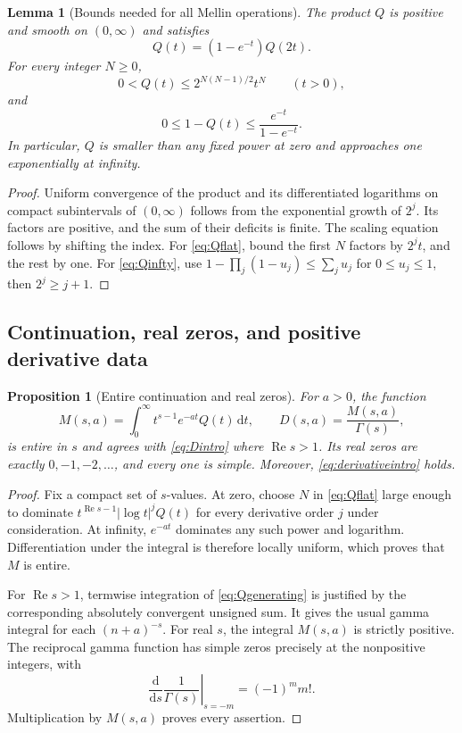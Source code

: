 \documentclass[11pt,letterpaper]{article}
\numberwithin{equation}{section}
\newtheorem{proposition}[theorem]{Proposition}
\newtheorem{lemma}[theorem]{Lemma}
\theoremstyle{definition}
\theoremstyle{remark}
\newcommand{\dd}{\,\mathrm d}
\DeclareMathOperator{\Rea}{Re}
\begin{document}
\begin{lemma}[Bounds needed for all Mellin operations]\label{lem:Qbounds}
The product $Q$ is positive and smooth on $(0,\infty)$ and satisfies
\begin{equation}\label{eq:Qscale}
 Q(t)=(1-e^{-t})Q(2t).
\end{equation}
For every integer $N\ge0$,
\begin{equation}\label{eq:Qflat}
 0<Q(t)\le 2^{N(N-1)/2}t^N\qquad(t>0),
\end{equation}
and
\begin{equation}\label{eq:Qinfty}
 0\le1-Q(t)\le\frac{e^{-t}}{1-e^{-t}}.
\end{equation}
In particular, $Q$ is smaller than any fixed power at zero and approaches
one exponentially at infinity.
\end{lemma}
\begin{proof}
Uniform convergence of the product and its differentiated logarithms on
compact subintervals of $(0,\infty)$ follows from the exponential growth of
$2^j$. Its factors are positive, and the sum of their deficits is finite.
The scaling equation follows by shifting the index.
For \eqref{eq:Qflat}, bound the first $N$ factors by $2^jt$, and the rest
by one. For \eqref{eq:Qinfty}, use
$1-\prod_j(1-u_j)\le\sum_j u_j$ for $0\le u_j\le1$, then
$2^j\ge j+1$.
\end{proof}

\subsection{Continuation, real zeros, and positive derivative data}
\begin{proposition}[Entire continuation and real zeros]\label{prop:entire}
For $a>0$, the function
\begin{equation}\label{eq:MellinD}
 M(s,a)=\int_0^\infty t^{s-1}e^{-at}Q(t)\dd t,
 \qquad D(s,a)=\frac{M(s,a)}{\Gamma(s)},
\end{equation}
is entire in $s$ and agrees with \eqref{eq:Dintro} where $\Rea s>1$.
Its real zeros are exactly $0,-1,-2,\ldots$, and every one is simple.
Moreover, \eqref{eq:derivativeintro} holds.
\end{proposition}
\begin{proof}
Fix a compact set of $s$-values. At zero, choose $N$ in
\eqref{eq:Qflat} large enough to dominate
$t^{\Rea s-1}|\log t|^jQ(t)$ for every derivative order $j$ under
consideration. At infinity, $e^{-at}$ dominates any such power and
logarithm. Differentiation under the integral is therefore locally uniform,
which proves that $M$ is entire.

For $\Rea s>1$, termwise integration of \eqref{eq:Qgenerating} is justified
by the corresponding absolutely convergent unsigned sum. It gives the
usual gamma integral for each $(n+a)^{-s}$.
For real $s$, the integral $M(s,a)$ is strictly positive.
The reciprocal gamma function has simple zeros precisely at the
nonpositive integers, with
\[
 \left.\frac{\mathrm d}{\mathrm ds}\frac1{\Gamma(s)}
 \right|_{s=-m}=(-1)^m m!.
\]
Multiplication by $M(s,a)$ proves every assertion.
\end{proof}
\end{document}
